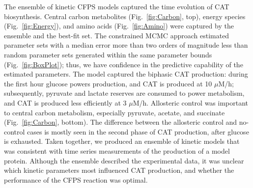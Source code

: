 \documentclass[12pt]{article}
\begin{document}
The ensemble of kinetic CFPS models captured the time evolution of CAT biosynthesis.
Central carbon metabolites (Fig.~\ref{fig:Carbon}, top), energy species (Fig.~\ref{fig:Energy}), and amino acids (Fig.~\ref{fig:Amino}) were captured by the ensemble and the best-fit set.
The constrained MCMC approach estimated parameter sets with a median error more than two orders of magnitude less than random parameter sets generated within the same parameter bounds (Fig.~\ref{fig:BoxPlot}); thus, we have confidence in the predictive capability of the estimated parameters.
The model captured the biphasic CAT production: during the first hour glucose powers production, and CAT is produced at 10 $\mu$M/h; subsequently, pyruvate and lactate reserves are consumed to power metabolism, and CAT is produced less efficiently at 3 $\mu$M/h.
Allosteric control was important to central carbon metabolism, especially pyruvate, acetate, and succinate (Fig.~\ref{fig:Carbon}, bottom).
The difference between the allosteric control and no-control cases is mostly seen in the second phase of CAT production, after glucose is exhausted.
Taken together, we produced an ensemble of kinetic models that was consistent with time series measurements of the production of a model protein.
Although the ensemble described the experimental data, it was unclear which kinetic parameters most influenced CAT production, and whether the performance of the CFPS reaction was optimal.
\end{document}
